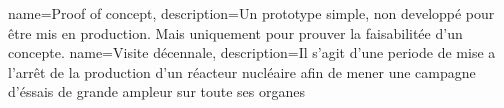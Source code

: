 \makeglossaries

{
    name=Proof of concept,
    description={Un prototype simple, non developpé pour être mis en production. Mais uniquement pour prouver la faisabilitée d'un concepte.}
}
{
    name=Visite décennale,
    description={Il s'agit d'une periode de mise a l'arrêt de la production d'un réacteur nucléaire afin de mener une campagne d'éssais de grande ampleur sur toute ses organes}
}

